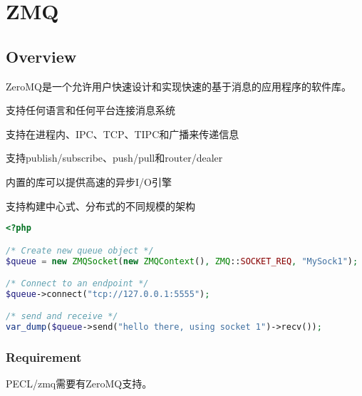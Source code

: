 \part{ZMQ}

\chapter{Overview}


ZeroMQ是一个允许用户快速设计和实现快速的基于消息的应用程序的软件库。

\begin{compactitem}
\item 支持任何语言和任何平台连接消息系统
\item 支持在进程内、IPC、TCP、TIPC和广播来传递信息
\item 支持publish/subscribe、push/pull和router/dealer
\item 内置的库可以提供高速的异步I/O引擎
\item 支持构建中心式、分布式的不同规模的架构
\end{compactitem}


\begin{lstlisting}[language=PHP]
<?php

/* Create new queue object */
$queue = new ZMQSocket(new ZMQContext(), ZMQ::SOCKET_REQ, "MySock1");

/* Connect to an endpoint */
$queue->connect("tcp://127.0.0.1:5555");

/* send and receive */
var_dump($queue->send("hello there, using socket 1")->recv());
\end{lstlisting}


\section{Requirement}


PECL/zmq需要有ZeroMQ支持。


